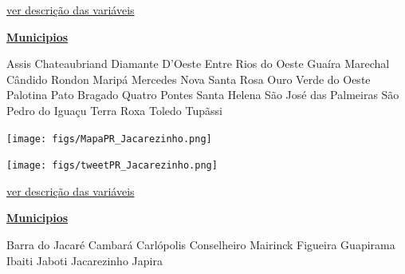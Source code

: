 \documentclass[10pt]{article} %
\begin{document}
\begin{minipage}[t]{.66\linewidth}
\begin{center}

\end{center}
\small{\hyperlink{vartab}{ver descrição das variáveis}}\end{minipage}\hfill\begin{minipage}[t]{.30\linewidth}
\begin{mdframed}[style=sidebar,frametitle={}]
\textbf{\hyperlink{municips}{Municipios}}\begin{itemize}\gsquare Assis Chateaubriand 
\gsquare Diamante D'Oeste 
\gsquare Entre Rios do Oeste 
\gsquare Guaíra 
\gsquare Marechal Cândido Rondon 
\gsquare Maripá 
\gsquare Mercedes 
\gsquare Nova Santa Rosa 
\gsquare Ouro Verde do Oeste 
\gsquare Palotina 
\gsquare Pato Bragado 
\gsquare Quatro Pontes 
\gsquare Santa Helena 
\gsquare São José das Palmeiras 
\gsquare São Pedro do Iguaçu 
\gsquare Terra Roxa 
\gsquare Toledo 
\gsquare Tupãssi 
\end{itemize}\BackToContents\end{mdframed}\hfill\end{minipage}\newpage\begin{minipage}[t]{.66\linewidth}
\hypertarget{Jcrz}{}
\texttt{[image: figs/MapaPR\_Jacarezinho.png]}\vspace{0.5cm}\vspace{0.5cm}\begin{center}
\texttt{[image: figs/tweetPR\_Jacarezinho.png]}\end{center}
\begin{center}

\end{center}
\small{\hyperlink{vartab}{ver descrição das variáveis}}\end{minipage}\hfill\begin{minipage}[t]{.30\linewidth}
\begin{mdframed}[style=sidebar,frametitle={}]
\textbf{\hyperlink{municips}{Municipios}}\begin{itemize}\gsquare Barra do Jacaré 
\gsquare Cambará 
\gsquare Carlópolis 
\gsquare Conselheiro Mairinck 
\gsquare Figueira 
\gsquare Guapirama 
\gsquare Ibaiti 
\gsquare Jaboti 
\gsquare Jacarezinho 
\gsquare Japira 

\end{itemize}
\end{mdframed}
\end{minipage}
\end{document}
